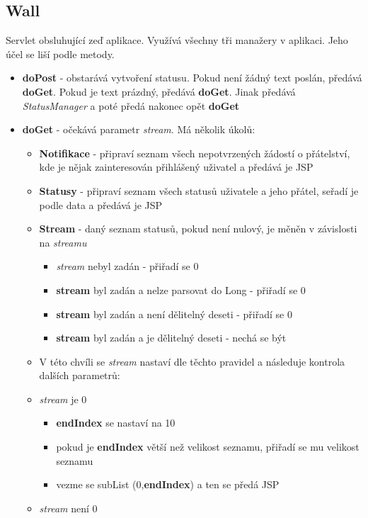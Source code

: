 \documentclass[
12pt,
a4paper,
pdftex,
czech,
titlepage
]{report}
\begin{document}
\subsection{Wall}

Servlet obsluhující zeď aplikace. Využívá všechny tři manažery v aplikaci. Jeho účel se liší podle metody.

\begin{itemize}
\item \textbf{doPost} - obstarává vytvoření statusu. Pokud není žádný text poslán, předává \textbf{doGet}. Pokud je text prázdný, předává \textbf{doGet}. Jinak předává \textit{StatusManager} a poté předá nakonec opět \textbf{doGet}
\item \textbf{doGet} - očekává parametr \textit{stream}. Má několik úkolů:
\begin{itemize}
\item \textbf{Notifikace} - připraví seznam všech nepotvrzených žádostí o přátelství, kde je nějak zainteresován přihlášený uživatel a předává je JSP
\item \textbf{Statusy} - připraví seznam všech statusů uživatele a jeho přátel, seřadí je podle data a předává je JSP
\item \textbf{Stream} - daný seznam statusů, pokud není nulový, je měněn v závislosti na \textit{streamu}
\begin{itemize}
\item \textit{stream} nebyl zadán - přiřadí se 0
\item \textbf{stream} byl zadán a nelze parsovat do Long - přiřadí se 0
\item \textbf{stream} byl zadán a není dělitelný deseti - přiřadí se 0
\item \textbf{stream} byl zadán a je dělitelný deseti - nechá se být
\end{itemize}
\item V této chvíli se \textit{stream} nastaví dle těchto pravidel a následuje kontrola dalších parametrů:
\item \textit{stream} je 0
\begin{itemize}
\item \textbf{endIndex} se nastaví na 10
\item pokud je \textbf{endIndex} větší než velikost seznamu, přiřadí se mu velikost seznamu
\item vezme se subList (0,\textbf{endIndex}) a ten se předá JSP
\end{itemize}
\item \textit{stream} není 0

\end{itemize}
\end{itemize}
\end{document}
